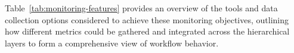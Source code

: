 Table~\ref{tab:monitoring-features} provides an overview of the tools and data collection options considered to achieve these monitoring objectives, outlining how different metrics could be gathered and integrated across the hierarchical layers to form a comprehensive view of workflow behavior.

\begin{table}[htbp]
    \centering
    \setlength{\tabcolsep}{6pt} %
    \renewcommand{\arraystretch}{1.2} %
    \small %
\end{table}
